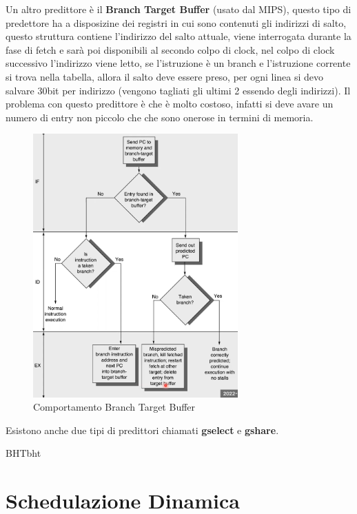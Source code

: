 \documentclass[12pt]{article}
\begin{document}
Un altro predittore \`e il \textbf{Branch Target Buffer} (usato dal MIPS), questo tipo di predettore ha a disposizine dei registri in cui sono contenuti gli indirizzi di salto, questo struttura contiene l'indirizzo del salto attuale, viene interrogata durante la fase di fetch e sar\`a poi disponibili al secondo colpo di clock, nel colpo di clock successivo l'indirizzo viene letto, se l'istruzione \`e un branch e l'istruzione corrente si trova nella tabella, allora il salto deve essere preso, per ogni linea si devo salvare 30bit per indirizzo (vengono tagliati gli ultimi 2 essendo degli indirizzi). Il problema con questo predittore \`e che \`e molto costoso, infatti si deve avare un numero di entry non piccolo che che sono onerose in termini di memoria.
\begin{figure}[H]
    \centering
    \includegraphics[width=0.7\textwidth]{comportamento-branch-target-buffer.png}
    \caption{Comportamento Branch Target Buffer}
    \label{fig:comportamento-branch-target-buffer}
\end{figure}

Esistono anche due tipi di predittori chiamati \textbf{gselect} e \textbf{gshare}.

\begin{example}{BHT}{bht}
    
\end{example}

\newpage
\section{Schedulazione Dinamica}
\end{document}
